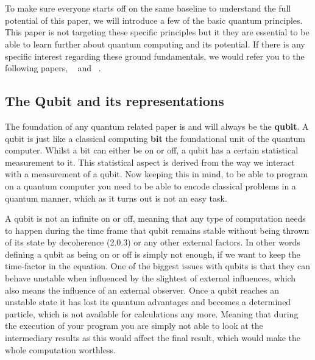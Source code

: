 \chapter{}
\label{ch:quantum-essentials}

To make sure everyone starts off on the same baseline to understand the full potential of this paper, we will introduce a few of the basic quantum principles. This paper is not targeting these specific principles but it they are essential to be able to learn further about quantum computing and its potential. If there is any specific interest regarding these ground fundamentals, we would refer you to the following papers, ~\textcite{Rieffel1998} and ~\textcite{Shor2000}.

\section{The Qubit and its representations}

The foundation of any quantum related paper is and will always be the \textbf{qubit}. A qubit is just like a classical computing \textbf{bit} the foundational unit of the quantum computer. Whilst a bit can either be on or off, a qubit has a certain statistical measurement to it. This statistical aspect is derived from the way we interact with a measurement of a qubit. Now keeping this in mind, to be able to program on a quantum computer you need to be able to encode classical problems in a quantum manner, which as it turns out is not an easy task.

A qubit is not an infinite on or off, meaning that any type of computation needs to happen during the time frame that qubit remains stable without being thrown of its state by decoherence (2.0.3) or any other external factors. In other words defining a qubit as being on or off is simply not enough, if we want to keep the time-factor in the equation.
One of the biggest issues with qubits is that they can behave unstable when influenced by the slightest of external influences, which also means the influence of an external observer. Once a qubit reaches an unstable state it has lost its quantum advantages and becomes a determined particle, which is not available for calculations any more. Meaning that during the execution of your program you are simply not able to look at the intermediary results as this would affect the final result, which would make the whole computation worthless.

